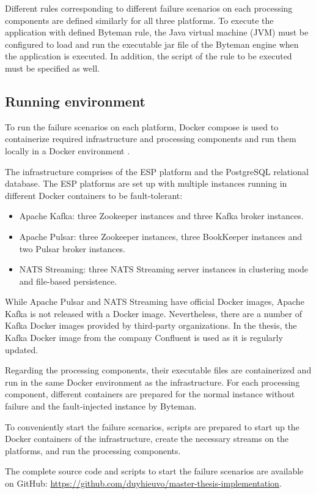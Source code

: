 Different rules corresponding to different failure scenarios on each processing components are defined similarly for all three platforms. To execute the application with defined Byteman rule, the Java virtual machine (JVM) must be configured to load and run the executable jar file of the Byteman engine when the application is executed. In addition, the script of the rule to be executed must be specified as well.

 

\subsection{Running environment}
To run the failure scenarios on each platform, Docker compose is used to containerize required infrastructure and processing components and run them locally in a Docker environment \cite{docker}.

The infrastructure comprises of the ESP platform and the PostgreSQL relational database. The ESP platforms are set up with multiple instances running in different Docker containers to be fault-tolerant:
\begin{itemize}
	\item Apache Kafka: three Zookeeper instances and three Kafka broker instances.
	\item Apache Pulsar: three Zookeeper instances, three BookKeeper instances and two Pulsar broker instances.
	\item NATS Streaming: three NATS Streaming server instances in clustering mode and file-based persistence.
\end{itemize}

While Apache Pulsar and NATS Streaming have official Docker images, Apache Kafka is not released with a Docker image. Nevertheless, there are a number of Kafka Docker images provided by third-party organizations. In the thesis, the Kafka Docker image from the company Confluent is used as it is regularly updated.

Regarding the processing components, their executable files are containerized and run in the same Docker environment as the infrastructure. For each processing component, different containers are prepared for the normal instance without failure and the fault-injected instance by Byteman. 

To conveniently start the failure scenarios, scripts are prepared to start up the Docker containers of the infrastructure, create the necessary streams on the platforms, and run the processing components.

The complete source code and scripts to start the failure scenarios are available on GitHub: \url{https://github.com/duyhieuvo/master-thesis-implementation}.